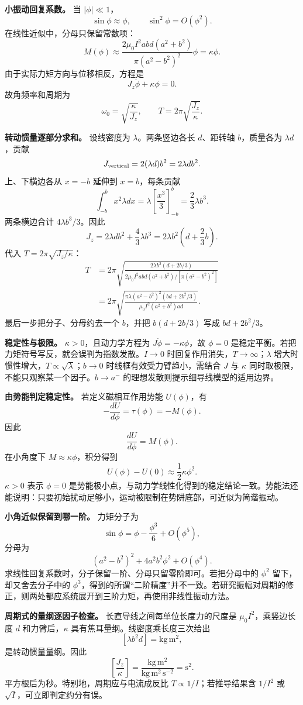 \documentclass[12pt,a4paper,UTF8]{ctexart}
\begin{document}
\textbf{小振动回复系数。} 当 \(|\phi|\ll1\)， \[
\sin\phi\approx\phi,\qquad
\sin^2\phi=O(\phi^2).
\] 在线性近似中，分母只保留常数项： \[
M(\phi)\approx
\frac{2\mu_0I^2abd(a^2+b^2)}
{\pi(a^2-b^2)^2}\phi
=\kappa\phi.
\] 由于实际力矩方向与位移相反，方程是 \[
J_z\ddot\phi+\kappa\phi=0.
\] 故角频率和周期为 \[
\omega_0=\sqrt{\frac\kappa{J_z}},
\qquad T=2\pi\sqrt{\frac{J_z}{\kappa}}.
\]

\textbf{转动惯量逐部分求和。} 设线密度为 \(\lambda\)。两条竖边各长
\(d\)、距转轴 \(b\)，质量各为 \(\lambda d\)，贡献 \[
J_{\rm vertical}=2(\lambda d)b^2=2\lambda db^2.
\] 上、下横边各从 \(x=-b\) 延伸到 \(x=b\)，每条贡献 \[
\int_{-b}^{b}x^2\lambda dx
=\lambda\left[\frac{x^3}{3}\right]_{-b}^{b}
=\frac23\lambda b^3.
\] 两条横边合计 \(4\lambda b^3/3\)。因此 \[
J_z=2\lambda db^2+\frac43\lambda b^3
=2\lambda b^2\left(d+\frac23b\right).
\] 代入 \(T=2\pi\sqrt{J_z/\kappa}\)： \[
\begin{aligned}
T
&=2\pi\sqrt{
\frac{2\lambda b^2(d+2b/3)}
{2\mu_0I^2abd(a^2+b^2)/[\pi(a^2-b^2)^2]}}\\
&=2\pi\sqrt{
\frac{\pi\lambda(a^2-b^2)^2
(bd+2b^2/3)}
{\mu_0I^2(a^2+b^2)ad}}.
\end{aligned}
\] 最后一步把分子、分母约去一个 \(b\)，并把 \(b(d+2b/3)\) 写成
\(bd+2b^2/3\)。

\textbf{稳定性与极限。} \(\kappa>0\)，且动力学方程为
\(J\ddot\phi=-\kappa\phi\)，故 \(\phi=0\)
是稳定平衡。若把力矩符号写反，就会误判为指数发散。\(I\to0\)
时回复作用消失，\(T\to\infty\)；\(\lambda\)
增大时惯性增大，\(T\propto\sqrt\lambda\)；\(b\to0\)
时线框有效受力臂趋小，需结合 \(J\) 与 \(\kappa\)
同时取极限，不能只观察某一个因子。\(b\to a^-\)
的理想发散则提示细导线模型的适用边界。

\textbf{由势能判定稳定性。} 若定义磁相互作用势能 \(U(\phi)\)，有 \[
-\frac{dU}{d\phi}=\tau(\phi)=-M(\phi).
\] 因此 \[
\frac{dU}{d\phi}=M(\phi).
\] 在小角度下 \(M\approx\kappa\phi\)，积分得到 \[
U(\phi)-U(0)\approx\frac12\kappa\phi^2.
\] \(\kappa>0\) 表示 \(\phi=0\)
是势能极小点，与动力学线性化得到的稳定结论一致。势能法还能说明：只要初始扰动足够小，运动被限制在势阱底部，可近似为简谐振动。

\textbf{小角近似保留到哪一阶。} 力矩分子为 \[
\sin\phi=\phi-\frac{\phi^3}{6}+O(\phi^5),
\] 分母为 \[
(a^2-b^2)^2+4a^2b^2\phi^2+O(\phi^4).
\] 求线性回复系数时，分子保留一阶、分母只留零阶即可。若把分母中的
\(\phi^2\) 留下，却又舍去分子中的
\(\phi^3\)，得到的所谓``二阶精度''并不一致。若研究振幅对周期的修正，则两处都应系统展开到三阶力矩，再使用非线性振动方法。

\textbf{周期式的量纲逐因子检查。} 长直导线之间每单位长度力的尺度是
\(\mu_0I^2\)，乘竖边长度 \(d\) 和力臂后，\(\kappa\)
具有焦耳量纲。线密度乘长度三次给出 \[
[\lambda b^2d]=\mathrm{kg\,m^2},
\] 是转动惯量量纲。因此 \[
\left[\frac{J_z}{\kappa}\right]
=\frac{\mathrm{kg\,m^2}}{
\mathrm{kg\,m^2\,s^{-2}}}
=\mathrm{s^2}.
\] 平方根后为秒。特别地，周期应与电流成反比
\(T\propto1/I\)；若推导结果含 \(1/I^2\) 或
\(\sqrt I\)，可立即判定约分有误。
\end{document}
